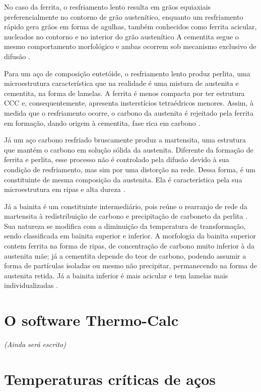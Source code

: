 \documentclass[brazil,tf,epusp]{usp}  %
\begin{document}
No caso da ferrita, o resfriamento lento resulta em grãos equiaxiais preferencialmente no contorno de grão austenítico, enquanto um resfriamento rápido gera grãos em forma de agulhas, também conhecidos como ferrita acicular, nucleados no contorno e no interior do grão austenítico \cite{Silva2010} %
A cementita segue o mesmo comportamento morfológico e ambas ocorrem sob mecanismo exclusivo de difusão \cite{Honeycombe1982}.

Para um aço de composição eutetóide, o resfriamento lento produz perlita, uma microestrutura característica que na realidade é uma mistura de austenita e cementita, na forma de lamelas. A ferrita é menos compacta por ter estrutura CCC e, consequentemente, apresenta insterstícios tetraédricos menores. Assim, à medida que o resfriamento ocorre, o carbono da austenita é rejeitado pela ferrita em formação, dando origem à cementita, fase rica em carbono \cite{Silva2010}.

Já um aço carbono resfriado bruscamente produz a martensita, uma estrutura que mantém o carbono em solução sólida da austenita. Diferente da formação de ferrita e perlita, esse processo não é controlado pela difusão devido à sua condição de resfriamento, mas sim por uma distorção na rede. Dessa forma, é um constituinte de mesma composição da austenita. Ela é característica pela sua microestrutura em ripas e alta dureza \cite{Honeycombe1982}.

Já a bainita é um constituinte intermediário, pois reúne o rearranjo de rede da martensita à redistribuição de carbono e precipitação de carboneto da perlita \cite{Totten2006}. Sua natureza se modifica com a diminuição da temperatura de transformação, sendo classificada em bainita superior e inferior. A morfologia da bainita superior contem ferrita na forma de ripas, de concentração de carbono muito inferior à da austenita mãe; já a cementita depende do teor de carbono, podendo assumir a forma de partículas isoladas ou mesmo não precipitar, permanecendo na forma de austenita retida. Já a bainita inferior é mais acicular e tem lamelas mais individualizadas \cite{Honeycombe1982}.

\section{O software Thermo-Calc\textregistered{}}
\textit{(Ainda será escrito)}

\section{Temperaturas cr\'iticas de aços}
\end{document}
